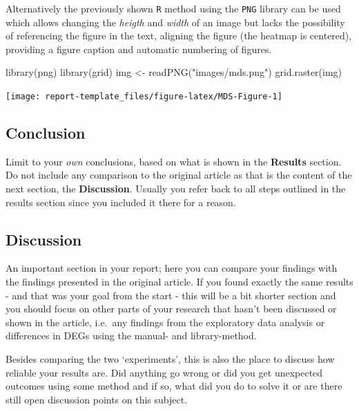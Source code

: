 \newpage

Alternatively the previously shown \texttt{R} method using the
\texttt{PNG} library can be used which allows changing the \emph{heigth}
and \emph{width} of an image but lacks the possibility of referencing
the figure in the text, aligning the figure (the heatmap is centered),
providing a figure caption and automatic numbering of figures.

\begin{Schunk}
\begin{Sinput}
library(png)
library(grid)
img <- readPNG("images/mds.png")
grid.raster(img)
\end{Sinput}

\texttt{[image: report-template\_files/figure-latex/MDS-Figure-1]} \end{Schunk}

\hypertarget{conclusion}{%
\subsection{Conclusion}\label{conclusion}}

Limit to your \emph{own} conclusions, based on what is shown in the
\textbf{Results} section. Do not include any comparison to the original
article as that is the content of the next section, the
\textbf{Discussion}. Usually you refer back to all steps outlined in the
results section since you included it there for a reason.

\hypertarget{discussion}{%
\subsection{Discussion}\label{discussion}}

An important section in your report; here you can compare your findings
with the findings presented in the original article. If you found
exactly the same results - and that was your goal from the start - this
will be a bit shorter section and you should focus on other parts of
your research that hasn't been discussed or shown in the article,
i.e.~any findings from the exploratory data analysis or differences in
DEGs using the manual- and library-method.

Besides comparing the two `experiments', this is also the place to
discuss how reliable your results are. Did anything go wrong or did you
get unexpected outcomes using some method and if so, what did you do to
solve it or are there still open discussion points on this subject.

